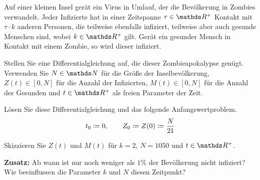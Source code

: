 \begin{atiTask}[
	title = Eine Zombieapokalypse,
	language = Deutsch
]
	Auf einer kleinen Insel gerät ein Virus in Umlauf, der die Bevölkerung in Zombies verwandelt.
	Jeder Infizierte hat in einer Zeitspanne $\tau\in\setR^+$ Kontakt mit $\tau\cdot k$ anderen Personen, die teilweise ebenfalls infiziert, teilweise aber auch gesunde Menschen sind, wobei $k\in\setR^+$ gilt.
	Gerät ein gesunder Mensch in Kontakt mit einem Zombie, so wird dieser infiziert.
	\medskip
	\begin{atiSubtasks}
		\item{
			Stellen Sie eine Differentialgleichung auf, die dieser Zombieapokalypse genügt.
			Verwenden Sie $N\in\setN$ für die Größe der Inselbevölkerung, $Z(t)\in[0,N]$ für die Anzahl der Infizierten, $M(t)\in[0,N]$ für die Anzahl der Gesunden und $t\in\setR^+$ als freien Parameter der Zeit.
		}
		\item{
			Lösen Sie diese Differentialgleichung und das folgende Anfangswertproblem.
			\[
				t_0\coloneqq 0,\qquad Z_0\coloneqq Z(0) \coloneqq \frac{N}{21}
			\]
		}
		\item{
			Skizzieren Sie $Z(t)$ und $M(t)$ für $k=2$, $N=1050$ und $t\in\setR^+$.
		}
		\item{
			\textbf{Zusatz:} Ab wann ist nur noch weniger als $1\unit{\%}$ der Bevölkerung nicht infiziert?
			Wie beeinflussen die Parameter $k$ und $N$ diesen Zeitpunkt?
		}
	\end{atiSubtasks}
\end{atiTask}
